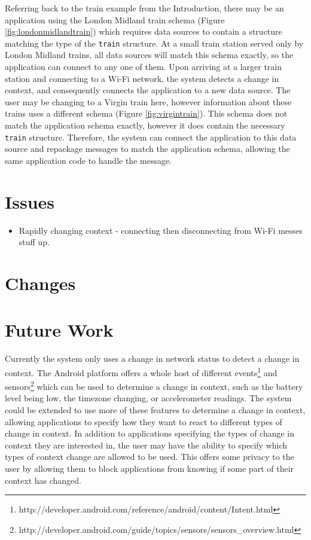 \documentclass[12pt,twoside,notitlepage]{report}
\begin{document}
Referring back to the train example from the Introduction, there may be an application using the London Midland train schema (Figure \ref{fig:londonmidlandtrain}) which requires data sources to contain a structure matching the type of the {\tt train} structure. 
At a small train station served only by London Midland trains, all data sources will match this schema exactly, so the application can connect to any one of them.
Upon arriving at a larger train station and connecting to a Wi-Fi network, the system detects a change in context, and consequently connects the application to a new data source. 
The user may be changing to a Virgin train here, however information about these trains uses a different schema (Figure \ref{fig:virgintrain}). 
This schema does not match the application schema exactly, however it does contain the necessary {\tt train} structure. 
Therefore, the system can connect the application to this data source and repackage messages to match the application schema, allowing the same application code to handle the message.


\section{Issues}

\begin{itemize}
\item Rapidly changing context - connecting then disconnecting from Wi-Fi messes stuff up.
\end{itemize}

\section{Changes}

\section{Future Work}

Currently the system only uses a change in network status to detect a change in context. 
The Android platform offers a whole host of different events\footnote{http://developer.android.com/reference/android/content/Intent.html} and sensors\footnote{http://developer.android.com/guide/topics/sensors/sensors\_overview.html} which can be used to determine a change in context, such as the battery level being low, the timezone changing, or accelerometer readings. 
The system could be extended to use more of these features to determine a change in context, allowing applications to specify how they want to react to different types of change in context. 
In addition to applications specifying the types of change in context they are interested in, the user may have the ability to specify which types of context change are allowed to be used. 
This offers some privacy to the user by allowing them to block applications from knowing if some part of their context has changed.
\end{document}

